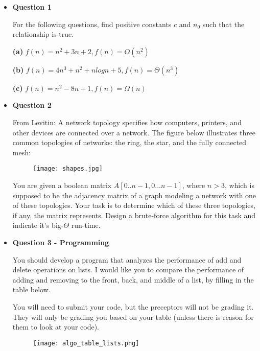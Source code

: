 \documentclass{article}
\begin{document}
\begin{itemize}
    \item\textbf{ Question 1}

For the following questions, find positive constants $c$ and $n_0$ such that the relationship is true.  
    
    \textbf{(a)} $f(n) = n^2 + 3n + 2, f(n) = O(n^2)$
    
    \textbf{(b)} $f(n) = 4n^3 + n^2 + nlogn + 5, f(n) = \Theta(n^3)$
    
    \textbf{(c)} $f(n) = n^2 - 8n + 1, f(n) = \Omega(n)$
    
    
    \item \textbf{Question 2}

    From Levitin: A network topology specifies how computers, printers, and other devices are connected over a network. The figure below illustrates three common topologies of networks: the ring, the star, and the fully connected mesh: 

    \begin{figure}[h]
        \centering
        \texttt{[image: shapes.jpg]}
        \label{fig:dubs}
    \end{figure}

    You are given a boolean matrix $A[0..n-1, 0...n-1]$, where $n>3$, which is supposed to be the adjacency matrix of a graph modeling a network with one of these topologies. Your task is to determine which of these three topologies, if any, the matrix represents. Design a brute-force algorithm for this task and indicate it's big-$\Theta$ run-time. 


    \item \textbf{Question 3 - Programming}
    
    You should develop a program that analyzes the performance of add and delete operations on lists. I would like you to compare the performance of adding and removing to the front, back, and middle of a list, by filling in the table below.  
    
    You will need to submit your code, but the preceptors will not be grading it.  They will only be grading you based on your table (unless there is reason for them to look at your code).  
    
   
    \begin{figure}[h]
        \centering
        \texttt{[image: algo\_table\_lists.png]}
        \label{fig:dubs}
    \end{figure}
        

\end{itemize}
\end{document}

